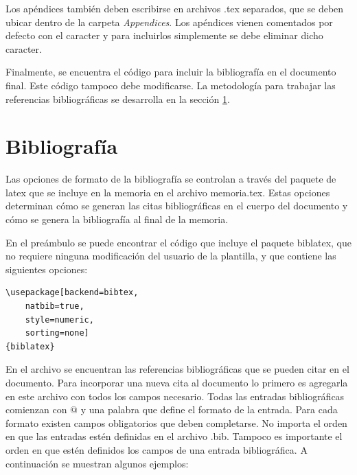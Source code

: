 \begin{verbatim}
	
	 
	
	 
	 
\end{verbatim}

Los apéndices también deben escribirse en archivos .tex separados, que se deben ubicar dentro de la carpeta \emph{Appendices}. Los apéndices vienen comentados por defecto con el caracter \code{\%} y para incluirlos simplemente se debe eliminar dicho caracter.

Finalmente, se encuentra el código para incluir la bibliografía en el documento final.  Este código tampoco debe modificarse. La metodología para trabajar las referencias bibliográficas se desarrolla en la sección \ref{sec:biblio}.

\section{Bibliografía}
\label{sec:biblio}

Las opciones de formato de la bibliografía se controlan a través del paquete de latex  que se incluye en la memoria en el archivo memoria.tex.  Estas opciones determinan cómo se generan las citas bibliográficas en el cuerpo del documento y cómo se genera la bibliografía al final de la memoria.

En el preámbulo se puede encontrar el código que incluye el paquete biblatex, que no requiere ninguna modificación del usuario de la plantilla, y que contiene las siguientes opciones:

\begin{lstlisting}
\usepackage[backend=bibtex,
	natbib=true, 
	style=numeric, 
	sorting=none]
{biblatex}
\end{lstlisting}

En el archivo  se encuentran las referencias bibliográficas que se pueden citar en el documento.  Para incorporar una nueva cita al documento lo primero es agregarla en este archivo con todos los campos necesario.  Todas las entradas bibliográficas comienzan con $@$ y una palabra que define el formato de la entrada.  Para cada formato existen campos obligatorios que deben completarse. No importa el orden en que las entradas estén definidas en el archivo .bib.  Tampoco es importante el orden en que estén definidos los campos de una entrada bibliográfica. A continuación se muestran algunos ejemplos:

